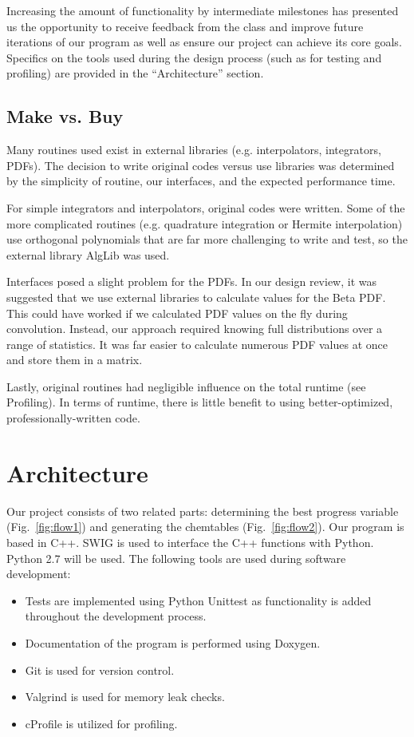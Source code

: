 \documentclass[11pt]{article}
\begin{document}
Increasing the amount of functionality by intermediate milestones has presented us the opportunity to receive feedback from the class and improve future iterations of our program as well as ensure our project can achieve its core goals. Specifics on the tools used during the design process (such as for testing and profiling) are provided in the “Architecture” section.

\subsection{Make vs. Buy}
Many routines used exist in external libraries (e.g. interpolators, integrators, PDFs). The decision to write original codes versus use libraries was determined by the simplicity of routine, our interfaces, and the expected performance time. 

For simple integrators and interpolators, original codes were written. Some of the more complicated routines (e.g. quadrature integration or Hermite interpolation) use orthogonal polynomials that are far more challenging to write and test, so the external library AlgLib was used. 

Interfaces posed a slight problem for the PDFs. In our design review, it was suggested that we use external libraries to calculate values for the Beta PDF. This could have worked if we calculated PDF values on the fly during convolution. Instead, our approach required knowing full distributions over a range of statistics. It was far easier to calculate numerous PDF values at once and store them in a matrix. 

Lastly, original routines had negligible influence on the total runtime (see Profiling). In terms of runtime, there is little benefit to using better-optimized, professionally-written code. 
 
\section{Architecture}
Our project consists of two related parts: determining the best progress variable (Fig.~\ref{fig:flow1}) and generating the chemtables (Fig.~\ref{fig:flow2}). Our program is based in C++. SWIG is used to interface the C++ functions with Python. Python 2.7 will be used. The following tools are used during software development:

\begin{itemize}
\item Tests are implemented using Python Unittest as functionality is added throughout the development process.
\item Documentation of the program is performed using Doxygen.
\item Git is used for version control.
\item Valgrind is used for memory leak checks.
\item cProfile is utilized for profiling.
\end{itemize}
\end{document}
